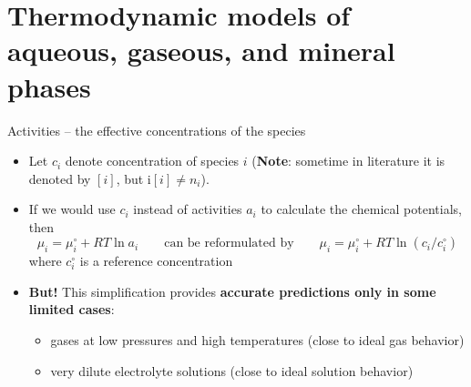\section{Thermodynamic models of aqueous, gaseous, and mineral phases}
%
%
\begin{frame}{Activities -- the effective concentrations of the species}
\begin{itemize}
\item Let $c_{i}$ denote concentration of species $i$ (\textbf{Note}: sometime in literature it is denoted by $[i]$, 
but i$[i] \neq n_i$).
\pause
\item If we would use $c_{i}$ instead of activities $a_{i}$ to calculate the chemical potentials, then
\[
\mu_{i}=\mu_{i}^{\circ}+RT\ln a_{i} \qquad\text{can be reformulated by} \qquad \mu_{i}=\mu_{i}^{\circ}+RT\ln(c_{i}/c_{i}^{\circ})
\]
where $c_{i}^{\circ}$ is a reference concentration
%
\pause
\item \alert{\textbf{But!}} This simplification provides \textbf{accurate predictions only in some limited cases}:
%
\begin{itemize}
\item gases at low pressures and high temperatures \alert{(close to ideal gas behavior)}
\item very dilute electrolyte solutions \alert{(close to ideal solution behavior)}
\end{itemize}
\end{itemize}
\end{frame}
%
%
